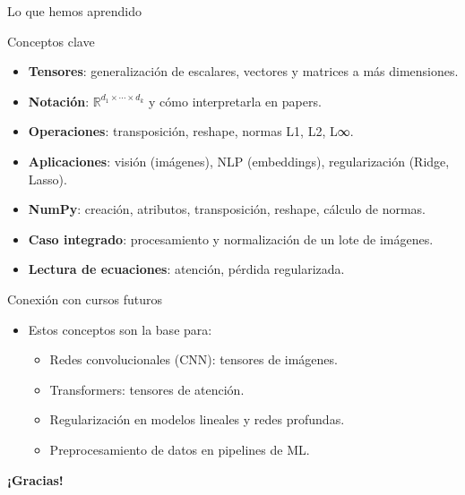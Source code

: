 \documentclass[aspectratio=169, 10pt, xcolor=table]{beamer}
\begin{document}
\begin{frame}{Lo que hemos aprendido}
    \begin{exampleblock}{Conceptos clave}
        \begin{itemize}
            \item \textbf{Tensores}: generalización de escalares, vectores y matrices a más dimensiones.
            \item \textbf{Notación}: $\mathbb{R}^{d_1\times\cdots\times d_k}$ y cómo interpretarla en papers.
            \item \textbf{Operaciones}: transposición, reshape, normas L1, L2, L∞.
            \item \textbf{Aplicaciones}: visión (imágenes), NLP (embeddings), regularización (Ridge, Lasso).
            \item \textbf{NumPy}: creación, atributos, transposición, reshape, cálculo de normas.
            \item \textbf{Caso integrado}: procesamiento y normalización de un lote de imágenes.
            \item \textbf{Lectura de ecuaciones}: atención, pérdida regularizada.
        \end{itemize}
    \end{exampleblock}
\end{frame}

\begin{frame}{Conexión con cursos futuros}
    \begin{itemize}
        \item Estos conceptos son la base para:
        \begin{itemize}
            \item Redes convolucionales (CNN): tensores de imágenes.
            \item Transformers: tensores de atención.
            \item Regularización en modelos lineales y redes profundas.
            \item Preprocesamiento de datos en pipelines de ML.
        \end{itemize}
    \end{itemize}
\end{frame}

\begin{frame}
    \centering
    \Huge \textbf{¡Gracias!}

\end{frame}
\end{document}
